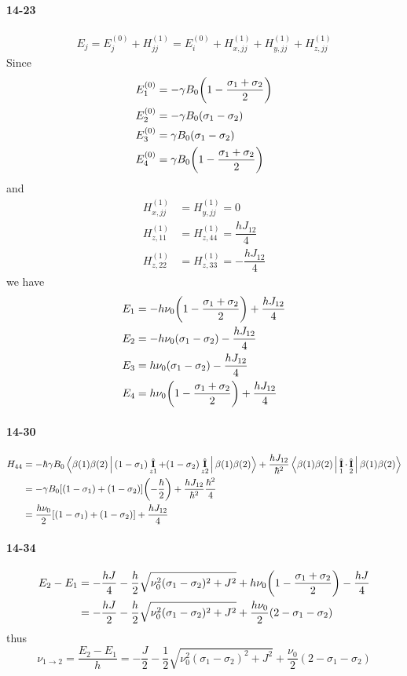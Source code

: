 \documentclass[a4paper]{article}
\DeclareMathOperator{\ra}{\rightarrow}
\DeclareMathOperator{\hI}{\hat{\vb{I}}}
\newcommand{\ex}[1]{\paragraph{14-#1}}
\newcommand{\ntg}{\notag\\}
\numberwithin{equation}{section}
\begin{document}
\ex{23}
\begin{align}
E_j = E_j^{(0)} + H_{jj}^{(1)} = E_i^{(0)} + H_{x,jj}^{(1)} + H_{y,jj}^{(1)} + H_{z,jj}^{(1)} 
\end{align}
Since
\begin{align}
E_1^{(0)} &= -\gamma B_0\qty(1 - \dfrac{\sigma_1 + \sigma_2}{2}) \\
E_2^{(0)} &= -\gamma B_0(\sigma_1 - \sigma_2) \\
E_3^{(0)} &= \gamma B_0(\sigma_1 - \sigma_2) \\
E_4^{(0)} &= \gamma B_0\qty(1 - \dfrac{\sigma_1 + \sigma_2}{2}) 
\end{align}
and
\begin{align}
H_{x,jj}^{(1)} &= H_{y,jj}^{(1)} = 0\\
H_{z,11}^{(1)} &= H_{z,44}^{(1)} = \dfrac{hJ_{12}}{4}\\
H_{z,22}^{(1)} &= H_{z,33}^{(1)} = -\dfrac{hJ_{12}}{4}
\end{align}
we have
\begin{align}
E_1 &= -h\nu_0\qty(1 - \dfrac{\sigma_1 + \sigma_2}{2}) + \dfrac{h J_{12}}{4} \\
E_2 &= -h\nu_0(\sigma_1 - \sigma_2) - \dfrac{h J_{12}}{4}\\
E_3 &= h\nu_0(\sigma_1 - \sigma_2) - \dfrac{h J_{12}}{4} \\
E_4 &= h\nu_0\qty(1 - \dfrac{\sigma_1 + \sigma_2}{2}) + \dfrac{h J_{12}}{4}
\end{align}

\ex{30}
\begin{align}
H_{44} &= -\hbar\gamma B_0\Braket{\beta(1)\beta(2) | (1-\sigma_1)\hI_{z1} + (1-\sigma_2)\hI_{z2} | \beta(1)\beta(2)} 
+ \dfrac{hJ_{12}}{\hbar^2}\Braket{\beta(1)\beta(2) | \hI_1\cdot\hI_2 | \beta(1)\beta(2)} \ntg
&= -\gamma B_0[(1-\sigma_1) + (1-\sigma_2)]\qty(-\dfrac{\hbar}{2}) + \dfrac{hJ_{12}}{\hbar^2}\dfrac{\hbar^2}{4} \ntg
&= \dfrac{h\nu_0}{2}[(1-\sigma_1) + (1-\sigma_2)] + \dfrac{hJ_{12}}{4}
\end{align}

\ex{34}
\begin{align}
E_2 - E_1 &= -\dfrac{hJ}{4} 
- \dfrac{h}{2}\sqrt{\nu_0^2(\sigma_1-\sigma_2)^2 + J^2} 
+ h\nu_0\qty(1 - \dfrac{\sigma_1+\sigma_2}{2}) - \dfrac{hJ}{4} \ntg
&= -\dfrac{hJ}{2} - \dfrac{h}{2}\sqrt{\nu_0^2(\sigma_1-\sigma_2)^2 + J^2} 
+ \dfrac{h\nu_0}{2}(2 - \sigma_1 - \sigma_2)
\end{align}
thus
\begin{equation}\label{key}
\nu_{1\ra 2} = \dfrac{E_2 - E_1}{h} = -\dfrac{J}{2} - \dfrac{1}{2}\sqrt{\nu_0^2(\sigma_1-\sigma_2)^2 + J^2} 
+ \dfrac{\nu_0}{2}(2 - \sigma_1 - \sigma_2)
\end{equation}
\end{document}
